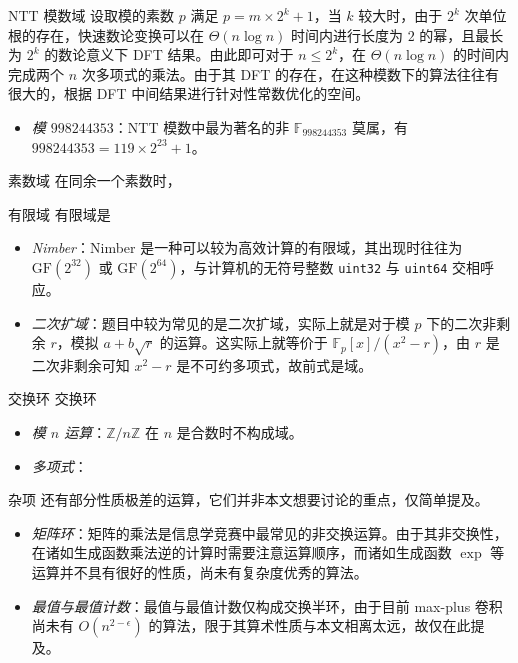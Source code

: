 \begin{asparadesc}
\item [NTT 模数域] 设取模的素数 $p$ 满足 $p= m\times 2^k+1$，当 $k$ 较大时，由于 $2^k$ 次单位根的存在，快速数论变换可以在 $\Theta(n\log n)$ 时间内进行长度为 $2$ 的幂，且最长为 $2^k$ 的数论意义下 DFT 结果。由此即可对于 $n\le 2^k$，在 $\Theta(n\log n)$ 的时间内完成两个 $n$ 次多项式的乘法。由于其 DFT 的存在，在这种模数下的算法往往有很大的，根据 DFT 中间结果进行针对性常数优化的空间。

\begin{itemize}
\item \emph{模 $998244353$}：NTT 模数中最为著名的非 $\mathbb F_{998244353}$ 莫属，有 $998244353 = 119\times 2^{23} + 1$。
\end{itemize}

\item [素数域] 在同余一个素数时，

\item [有限域] 有限域是

\begin{itemize}
\item \emph{Nimber}：Nimber 是一种可以较为高效计算的有限域，其出现时往往为 $\mathrm{GF}(2^{32})$ 或 $\mathrm{GF}(2^{64})$，与计算机的无符号整数 \texttt{uint32} 与 \texttt{uint64} 交相呼应。
\item \emph{二次扩域}：题目中较为常见的是二次扩域，实际上就是对于模 $p$ 下的二次非剩余 $r$，模拟 $a + b\sqrt r$ 的运算。这实际上就等价于 $\mathbb F_p[x]/(x^2-r)$，由 $r$ 是二次非剩余可知 $x^2-r$ 是不可约多项式，故前式是域。
\end{itemize}

\item [交换环] 交换环

\begin{itemize}
\item \emph{模 $n$ 运算}：$\mathbb Z/n\mathbb Z$ 在 $n$ 是合数时不构成域。
\item \emph{多项式}：
\end{itemize}

\item [杂项] 还有部分性质极差的运算，它们并非本文想要讨论的重点，仅简单提及。

\begin{itemize}
\item \emph{矩阵环}：矩阵的乘法是信息学竞赛中最常见的非交换运算。由于其非交换性，在诸如生成函数乘法逆的计算时需要注意运算顺序，而诸如生成函数 $\exp$ 等运算并不具有很好的性质，尚未有复杂度优秀的算法。
\item \emph{最值与最值计数}：最值与最值计数仅构成交换半环，由于目前 max-plus 卷积尚未有 $O(n^{2-\epsilon})$ 的算法，限于其算术性质与本文相离太远，故仅在此提及。
\end{itemize}

\end{asparadesc}

